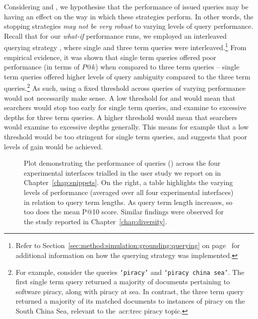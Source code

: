 Considering  and , we hypothesise that the performance of issued queries may be having an effect on the way in which these strategies perform. In other words, the stopping strategies \emph{may not be very robust} to varying levels of query performance. Recall that for our \emph{what-if} performance runs, we employed an interleaved querying strategy , where single and three term queries were interleaved.\footnote{Refer to Section~\ref{sec:method:simulation:grounding:querying} on page~\pageref{sec:method:simulation:grounding:querying} for additional information on how the querying strategy was implemented.} From empirical evidence, it was shown that single term queries offered poor performance (in terms of $P@k$) when compared to three term queries -- single term queries offered higher levels of query ambiguity compared to the three term queries.\footnote{For example, consider the queries \texttt{`piracy'} and \texttt{`piracy china sea'}. The first single term query returned a majority of documents pertaining to software piracy, along with piracy at sea. In contrast, the three term query returned a majority of its matched documents to instances of piracy on the South China Sea, relevant to the~\gls{acr:trec} piracy topic.} As such, using a fixed threshold across queries of varying performance would not necessarily make sense. A low threshold for  and  would mean that searchers would stop too early for single term queries, and examine to excessive depths for three term queries. A higher threshold would mean that searchers would examine to excessive depths generally. This means for example that a low threshold would be too stringent for single term queries, and suggests that poor levels of gain would be achieved.

\begin{figure}[t!]
    \centering
    \caption[Query performance by real-world subjects]{Plot demonstrating the performance of queries () across the four experimental interfaces trialled in the user study we report on in Chapter~\ref{chap:snippets}. On the right, a table highlights the varying levels of performance (averaged over all four experimental interfaces) in relation to query term lengths. As query term length increases, so too does the mean P@10 score. Similar findings were observed for the study reported in Chapter~\ref{chap:diversity}.}
    \label{fig:query_performance_ch7}
\end{figure}

